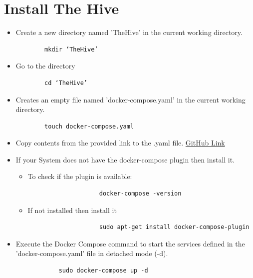 \documentclass{book}
\begin{document}
\section{Install The Hive}
\begin{itemize}
    \item Create a new directory named 'TheHive' in the current working directory.
    \begin{verbatim}
        mkdir ‘TheHive’
    \end{verbatim}
     
     \item Go to the directory
    \begin{verbatim}
        cd ‘TheHive’
    \end{verbatim}

    \item Creates an empty file named 'docker-compose.yaml' in the current working directory.
    \begin{verbatim}
        touch docker-compose.yaml
    \end{verbatim}

    \newpage

    \item Copy contents from the provided link to the .yaml file.
        \href{https://github.com/ls111-cybersec/thehive-cortex-misp-docker-compose-lab11update/blob/main/docker-compose.yml}{GitHub Link}
    \item If your System does not have the docker-compose plugin then install it.
        \begin{itemize}
            \item To check if the plugin is available:
                \begin{verbatim}
                    docker-compose -version
                \end{verbatim}
            \item If not installed then install it
                \begin{verbatim}
                    sudo apt-get install docker-compose-plugin
                \end{verbatim}      
        \end{itemize}
    \item Execute the Docker Compose command to start the services defined in the 'docker-compose.yaml' file in detached mode (-d).
        \begin{verbatim}
            sudo docker-compose up -d
        \end{verbatim} 
\end{itemize}
\end{document}
